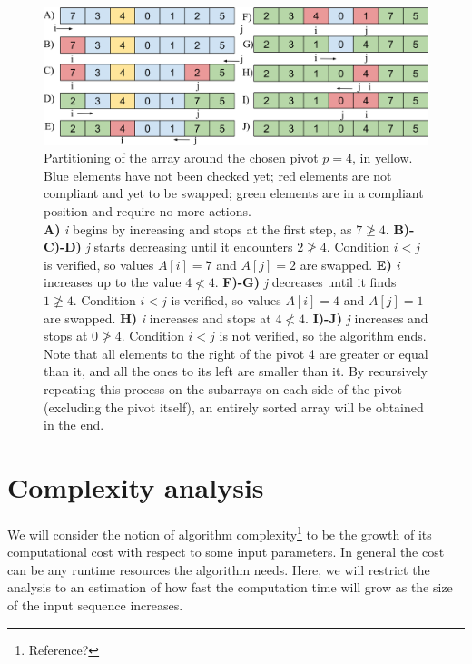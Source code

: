 \documentclass[]{finalproject}
\begin{document}
\begin{figure}[H]
\begin{center}
\includegraphics[scale=0.4]{img/pivot_partitioning.png}
\end{center}
\caption{Partitioning of the array around the chosen pivot $p=4$, in yellow.
Blue elements have not been checked yet; red elements are not compliant and yet to be swapped; green elements are in a compliant position and require no more actions. \\
\textbf{A)} \textit{i} begins by increasing and stops at the first step, as $7 \ngeq 4$.
\textbf{B)-C)-D)} \textit{j} starts decreasing until it encounters $2 \ngeq 4$. Condition $i<j$ is verified, so values $A[i]=7$ and $A[j]=2$ are swapped.
\textbf{E)} \textit{i} increases up to the value $4 \nless 4$.
\textbf{F)-G)} \textit{j} decreases until it finds $1 \ngeq 4$. Condition $i<j$ is verified, so values $A[i]=4$ and $A[j]=1$ are swapped.
\textbf{H)} \textit{i} increases and stops at $4 \nless 4$.
\textbf{I)-J)} \textit{j} increases and stops at $0 \ngeq 4$. Condition $i<j$ is not verified, so the algorithm ends. \\
Note that all elements to the right of the pivot 4 are greater or equal than it, and all the ones to its left are smaller than it.
By recursively repeating this process on the subarrays on each side of the pivot (excluding the pivot itself), an entirely sorted array will be obtained in the end.}
\label{fig:rec-part2}
\end{figure}


\section{Complexity analysis}

We will consider the notion of algorithm complexity\footnote{Reference?} to be the growth of its computational cost with respect to some input parameters. In general the cost can be any runtime resources the algorithm needs. Here, we will restrict the analysis to an estimation of how fast the computation time will grow as the size of the input sequence increases.
\end{document}
